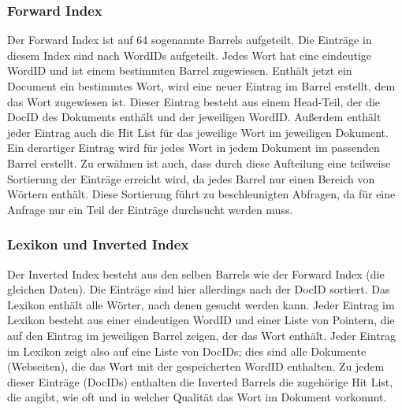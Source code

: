 \documentclass[12pt, a4paper]{llncs}
\begin{document}
	\subsubsection{Forward Index}
	Der Forward Index ist auf 64 sogenannte Barrels aufgeteilt. Die Einträge in diesem Index sind nach WordIDs aufgeteilt. Jedes Wort hat eine eindeutige WordID und ist 
	einem bestimmten Barrel zugewiesen. Enthält jetzt ein Document ein bestimmtes Wort, wird eine neuer Eintrag im Barrel erstellt, dem das Wort zugewiesen ist. Dieser
	Eintrag besteht aus einem Head-Teil, der die DocID des Dokuments enthält und der jeweiligen WordID. Außerdem enthält jeder Eintrag auch die Hit List für das jeweilige
	Wort im jeweiligen Dokument. Ein derartiger Eintrag wird für jedes Wort in jedem Dokument im passenden Barrel erstellt. Zu erwähnen ist auch, dass durch diese Aufteilung
	eine teilweise Sortierung der Einträge erreicht wird, da jedes Barrel nur einen Bereich von Wörtern enthält. Diese Sortierung führt zu beschleunigten Abfragen, da für eine
	Anfrage nur ein Teil der Einträge durchsucht werden muss\cite{page98}.
	
	\subsubsection{Lexikon und Inverted Index}
	Der Inverted Index besteht aus den selben Barrels wie der Forward Index (die gleichen Daten). Die Einträge sind hier allerdings nach der DocID sortiert.
	Das Lexikon enthält alle Wörter, nach denen gesucht werden kann. Jeder Eintrag im Lexikon besteht aus einer eindeutigen WordID und einer Liste von Pointern, die auf den
	Eintrag im jeweiligen Barrel zeigen, der das Wort enthält. Jeder Eintrag im Lexikon zeigt also auf eine Liste von DocIDs; dies sind alle Dokumente (Webseiten), die das
	Wort mit der gespeicherten WordID enthalten. Zu jedem dieser Einträge (DocIDs) enthalten die Inverted Barrels die zugehörige Hit List, die angibt, wie oft und in welcher
	Qualität das Wort im Dokument vorkommt\cite{page98}.
	
	
\end{document}
